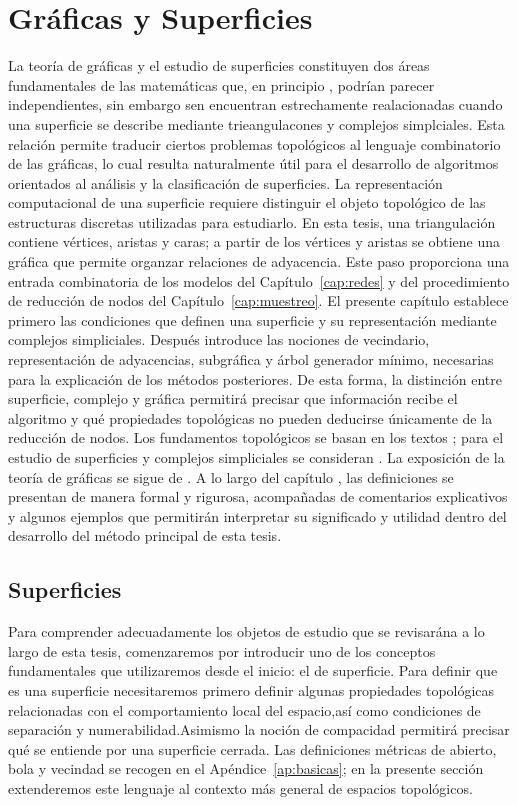 \chapter{Gráficas y Superficies}\label{cap:graficasysuperficies}

La teoría de gráficas y el estudio de superficies constituyen dos áreas fundamentales de las matemáticas que, en principio , podrían parecer independientes, sin embargo sen encuentran estrechamente realacionadas cuando una superficie se describe mediante trieangulacones y complejos simplciales. Esta relación permite traducir ciertos problemas topológicos al lenguaje combinatorio de las gráficas, lo cual resulta naturalmente útil para el desarrollo de algoritmos orientados al análisis y la clasificación de superficies.
La representación computacional de una superficie requiere distinguir el objeto topológico de las estructuras discretas utilizadas para estudiarlo. En esta tesis, una triangulación contiene vértices, aristas y caras; a partir de los vértices y aristas se obtiene una gráfica que permite organzar relaciones de adyacencia. Este paso proporciona una entrada combinatoria de los modelos del Capítulo~\ref{cap:redes} y del procedimiento de reducción de nodos del Capítulo~\ref{cap:muestreo}.
El presente capítulo establece primero las condiciones que definen una superficie y su representación mediante complejos simpliciales. Después introduce las nociones de vecindario, representación de adyacencias, subgráfica y árbol generador mínimo, necesarias para la explicación de los métodos posteriores. De esta forma, la distinción entre superficie, complejo y gráfica permitirá precisar que información recibe el algoritmo y qué propiedades topológicas no pueden deducirse únicamente de la reducción de nodos.
Los fundamentos topológicos se basan en los textos \cite{prieto_topologia_2003,munkres_topology_2000}; para el estudio de superficies y complejos simpliciales se consideran \cite{pressley,minian_complejos_simpliciales_poliedros}. La exposición de la teoría de gráficas se sigue de \cite{haru,diestel}.
A lo largo del capítulo , las definiciones se presentan de manera formal y rigurosa, acompañadas de comentarios explicativos y algunos ejemplos que permitirán interpretar su significado y utilidad dentro del desarrollo del método principal de esta tesis.

\section{Superficies}
Para comprender adecuadamente los objetos de estudio que se revisarána a lo largo de esta tesis, comenzaremos por introducir uno de los conceptos fundamentales que utilizaremos desde el inicio: el de superficie.
Para definir que es una superficie necesitaremos primero definir algunas propiedades topológicas relacionadas con el comportamiento local del espacio,así como condiciones de separación y numerabilidad.Asimismo la noción de compacidad permitirá precisar qué se entiende por una superficie cerrada. Las definiciones métricas de abierto, bola y vecindad se recogen en el Apéndice~\ref{ap:basicas}; en la presente sección extenderemos este lenguaje al contexto más general de espacios topológicos.

